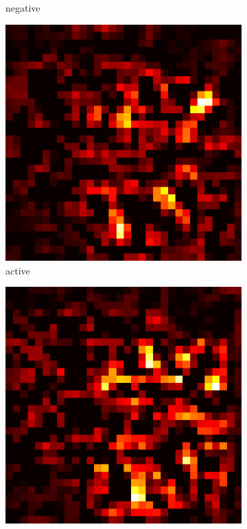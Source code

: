 \documentclass[preprint,12pt]{elsarticle}
\begin{document}
\begin{figure}
\begin{subfigure}{0.14\textwidth}
        \caption{negative}
    \end{subfigure}
    \hfill
    \begin{subfigure}{0.14\textwidth}
        \centering
        \includegraphics[width=\linewidth]{../visualizations/examples/cifar10/cnn/active_saliency_map/1.png}
        \caption{active}
    \end{subfigure}
    \hfill
    \begin{subfigure}{0.14\textwidth}
        \centering
        \includegraphics[width=\linewidth]{../visualizations/examples/cifar10/cnn/inactive_saliency_map/1.png}

\end{subfigure}
\end{figure}
\end{document}
